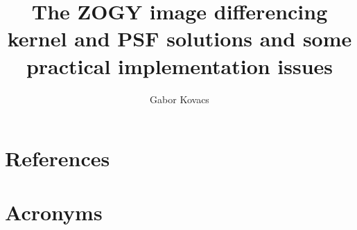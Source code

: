\documentclass[DM,authoryear,toc]{lsstdoc}
\title{The ZOGY image differencing kernel and PSF solutions and some practical implementation issues}
\author{%
Gabor Kovacs
}
\date{\vcsDate}
\begin{document}
\maketitle


\appendix
\section{References} \label{sec:bib}
\renewcommand{\refname}{} %


\section{Acronyms} \label{sec:acronyms}

\end{document}
